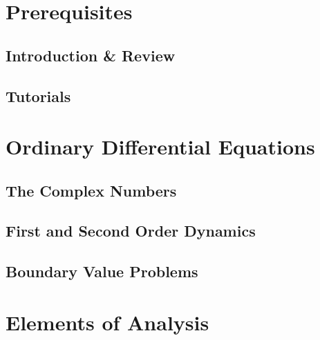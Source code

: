 \documentclass[12pt,letterpaper, openany]{book} %
\begin{document}

\frontmatter



%

\clearpage
\thispagestyle{empty}

\tableofcontents

\mainmatter

\part*{Prerequisites}
\chapter{Introduction \& Review}


\chapter{Tutorials}


\part{Ordinary Differential Equations}

\chapter{The Complex Numbers}


\chapter{First and Second Order Dynamics}


\chapter{Boundary Value Problems}


\part{Elements of Analysis}
\end{document}
